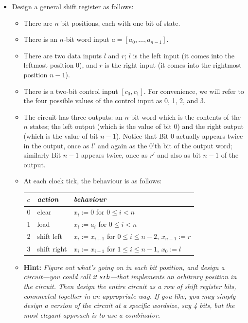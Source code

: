 \documentclass[a4paper,openany,fleqn]{book}
\begin{document}
\begin{itemize}
\item Design a general shift register as follows:
  \begin{itemize}
  \item There are $n$ bit positions, each with one bit of state.
  \item There is an $n$-bit word input $a = [a_0, \ldots, a_{n-1}]$.
  \item There are two data inputs $l$ and $r$; $l$ is the left input
    (it comes into the leftmost position $0$), and $r$ is the right
    input (it comes into the rightmost position $n-1$).
  \item There is a two-bit control input $[c_0,c_1]$.  For
    convenience, we will refer to the four possible values of the
    control input as 0, 1, 2, and 3.
  \item The circuit has three outputs: an $n$-bit word which is the
    contents of the $n$ states; the left output (which is the value of
    bit 0) and the right output (which is the value of bit $n-1$).
    Notice that Bit 0 actually appears twice in the output, once as
    $l'$ and again as the 0'th bit of the output word; similarly Bit
    $n-1$ appears twice, once as $r'$ and also as bit $n-1$ of the
    output.
  \item At each clock tick, the behaviour is as follows:
\begin{center}
  \begin{tabular}{|l|l|l|} \hline
    $c$  &  \emph{action} & \emph{behaviour} \\ \hline
    0  &  clear  & $x_i := 0$ for $0 \leq i < n$ \\
    1  &  load   & $x_i := a_i$ for $0 \leq i <n$ \\
    2  &  shift left &$x_i := x_{i+1}$ for $0 \leq i \leq n-2$,
            $x_{n-1} := r$  \\
    3  &  shift right &$x_i := x_{i-1}$ for $1 \leq i \leq n-1$,
            $x_0 := l$\\
    \hline
  \end{tabular}
\end{center}
\item \textbf{Hint:} \emph{Figure out what's going on in each bit
    position, and design a circuit---you could call it
    \texttt{srb}---that implements an arbitrary position in the
    circuit.  Then design the entire circuit as a row of shift
    register bits, connnected together in an appropriate way.  If you
    like, you may simply design a version of the circuit at a specific
    wordsize, say 4 bits, but the most elegant approach is to use a
    combinator.}
\end{itemize}
\end{itemize}
\end{document}
